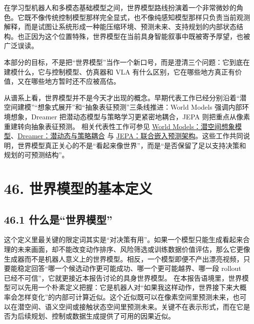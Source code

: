 

在学习型机器人和多模态基础模型之间，世界模型路线扮演着一个非常微妙的角色。它既不像传统控制模型那样完全显式，也不像纯感知模型那样只负责当前观测解释，而是试图让系统形成一种能压缩环境、预测未来、支持规划的内部状态结构。也正因为这个位置特殊，世界模型在当前具身智能叙事中既被寄予厚望，也被广泛误读。

本部分的目标，不是把“世界模型”当作一个新口号，而是澄清三个问题：它到底在建模什么，它与控制模型、仿真器和 VLA 有什么区别，它在哪些地方真正有价值，又在哪些地方暂时还不应被高估。

从谱系上看，世界模型并不是今天才出现的概念。早期代表工作已经分别沿着“潜空间建模”“想象式展开”和“抽象表征预测”三条线推进：World Models 强调内部环境想象，Dreamer 把潜动态模型与策略学习更紧密地耦合，JEPA 则把重点从像素重建转向抽象表征预测。 相关代表性工作可参见 \href{https://arxiv.org/abs/1803.10122}{World Models：潜空间想象模型}、\href{https://arxiv.org/abs/1912.01603}{Dreamer：潜动态与策略耦合} 与 \href{https://arxiv.org/abs/2301.08243}{JEPA：联合嵌入预测架构}。这些工作共同说明，世界模型真正关心的不是“看起来像世界”，而是“是否保留了足以支持决策和规划的可预测结构”。

\section*{46. 世界模型的基本定义}

\subsection*{46.1 什么是“世界模型”}


这个定义里最关键的限定词其实是“对决策有用”。如果一个模型只能生成看起来合理的未来画面，却不能改变动作排序、风险筛选或训练数据价值评估，那么它更像生成器而不是机器人意义上的世界模型。相反，一个模型即便不产出漂亮视频，只要能稳定回答“哪一个候选动作更可能成功、哪一个更可能越界、哪一段 rollout 已经不可信”，它就更接近本报告讨论的具身世界模型。 在本报告语境里，世界模型可以先用一个朴素定义把握：它是机器人对“如果我这样动作，世界接下来大概率会怎样变化”的内部可计算近似。这个近似既可以在像素空间里预测未来，也可以在潜空间、语义空间或接触状态空间里预测未来。关键不在表示形式，而在它是否为后续规划、控制或数据生成提供了可用的因果近似。

